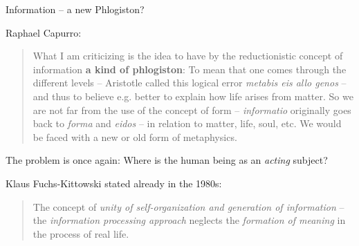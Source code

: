 \documentclass{beamer}
\begin{document}
\begin{frame}{Information -- a new Phlogiston?}

Raphael Capurro:\vfill
\begin{quote}\small
  What I am criticizing is the idea to have by the reductionistic concept of
  information \textbf{a kind of phlogiston}: To mean that one comes through
  the different levels -- Aristotle called this logical error \emph{metabis
    eis allo genos} -- and thus to believe e.g. better to explain how life
  arises from matter. So we are not far from the use of the concept of form --
  \emph{informatio} originally goes back to \emph{forma} and \emph{eidos} --
  in relation to matter, life, soul, etc. We would be faced with a new or old
  form of metaphysics.
\end{quote}

The problem is once again: Where is the human being as an \emph{acting}
subject?

Klaus Fuchs-Kittowski stated already in the 1980s: \vfill
\begin{quote}\small
  The concept of \emph{unity of self-organization and generation of
    information} -- the \emph{information processing approach} neglects the
  \emph{formation of meaning} in the process of real life.
\end{quote}\vspace*{1em}
\end{frame}
\end{document}
